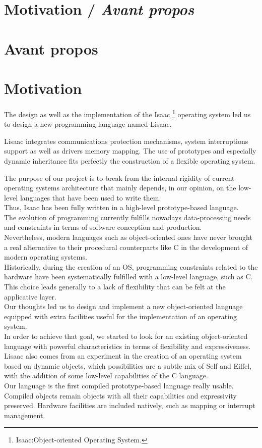\documentclass[11pt]{mybook}
\newcommand{\isaac}{I{\sc{}saac} }
\newcommand{\en}[1]
{
  \if \englishversion 1
  #1
  \fi
}
\newcommand{\sectionenfr}[2]
{
  \if \frenchversion 1
    \if \englishversion 1    
     \section{#1 / \textit{#2}}
    \else
      \section{#2}
    \fi
  \else
    \section{#1}
  \fi
}
\begin{document}
\sectionenfr{Motivation}{Avant propos}
\label{introduction:motivation}
%
\en{
The design as well as the implementation of the \isaac
\footnote{Isaac:Object-oriented Operating System.} operating system
\cite{httpisaac} led us to design a new programming language 
named Lisaac.

Lisaac integrates communications protection mechanisms, system
interruptions support as well as drivers memory mapping. 
The use of prototypes and especially dynamic inheritance fits perfectly
the construction of a flexible operating system.

The purpose of our project is to break from the internal rigidity of
current operating systems architecture that mainly
depends, in our opinion, on the low-level languages that have been
used to write them.\\ 
Thus, Isaac has been fully written in a high-level
prototype-based language.\\

The evolution of programming currently fulfills
nowadays data-processing needs and constraints in terms of 
software conception and production.\\
Nevertheless, modern languages such as object-oriented ones have
never brought a real alternative to their procedural counterparts
like C  in the development of modern operating systems.\\

Historically, during the creation of an OS, 
programming constraints related to the hardware have been 
systematically fulfilled with a low-level language, such as C.\\
This choice leads generally to a lack of flexibility that can be 
felt at the applicative layer.\\

Our thoughts led us to design and implement a new object-oriented
language equipped with extra facilities useful for the implementation of an
operating  system.\\
In order to achieve that goal, we started to look for an existing 
object-oriented language with powerful characteristics in terms of 
flexibility and expressiveness.\\

Lisaac also comes from an experiment in the creation of
an operating system based on dynamic objects, which possibilities 
are a subtle mix of Self and Eiffel, with the addition of some
low-level  capabilities of the C language.\\
Our language is the first compiled prototype-based language
really usable. Compiled objects remain objects with all their
capabilities and expressivity preserved. Hardware facilities
are included natively, such as mapping or
interrupt management. 
}
\end{document}
